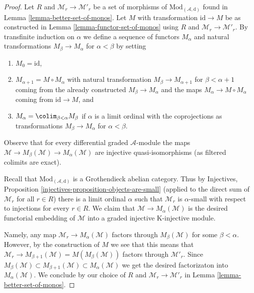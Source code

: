 \begin{proof}
Let $R$ and $\mathcal{M}_r \to \mathcal{M}'_r$ be a set of
morphisms of $\text{Mod}_{(\mathcal{A}, \text{d})}$ found in
Lemma \ref{lemma-better-set-of-monos}.
Let $M$ with transformation $\text{id} \to M$
be as constructed in Lemma \ref{lemma-functor-set-of-monos}
using $R$ and $\mathcal{M}_r \to \mathcal{M}'_r$.
By transfinite induction on $\alpha$ we define a sequence of functors
$M_\alpha$ and natural transformations $M_\beta \to M_\alpha$
for $\alpha < \beta$ by setting
\begin{enumerate}
\item $M_0 = \text{id}$,
\item $M_{\alpha + 1} = M \circ M_\alpha$ with natural transformation
$M_\beta \to M_{\alpha + 1}$ for $\beta < \alpha + 1$
coming from the already constructed $M_\beta \to M_\alpha$ and the
maps $M_\alpha \to M \circ M_\alpha$ coming from $\text{id} \to M$, and
\item $M_\alpha = \colim_{\beta < \alpha} M_\beta$ if $\alpha$
is a limit ordinal with the coprojections as transformations
$M_\beta \to M_\alpha$ for $\alpha < \beta$.
\end{enumerate}
Observe that for every differential graded $\mathcal{A}$-module the maps
$\mathcal{M} \to M_\beta(\mathcal{M}) \to M_\alpha(\mathcal{M})$
are injective quasi-isomorphisms (as filtered colimits are exact).

\medskip\noindent
Recall that $\text{Mod}_{(\mathcal{A}, \text{d})}$ is a Grothendieck
abelian category. Thus by
Injectives, Proposition \ref{injectives-proposition-objects-are-small}
(applied to the direct sum of $\mathcal{M}_r$ for all $r \in R$)
there is a limit ordinal $\alpha$ such that $\mathcal{M}_r$ is $\alpha$-small
with respect to injections for every $r \in R$.
We claim that $\mathcal{M} \to M_\alpha(\mathcal{M})$ is
the desired functorial embedding of $\mathcal{M}$ into a
graded injective K-injective module.

\medskip\noindent
Namely, any map $\mathcal{M}_r \to M_\alpha(\mathcal{M})$
factors through $M_\beta(\mathcal{M})$ for some $\beta < \alpha$.
However, by the construction of $M$ we see that this means
that $\mathcal{M}_r \to M_{\beta + 1}(\mathcal{M}) = M(M_\beta(\mathcal{M}))$
factors through $\mathcal{M}'_r$. Since
$M_\beta(\mathcal{M}) \subset  M_{\beta + 1}(\mathcal{M})
\subset M_\alpha(\mathcal{M})$ we get the desired factorizaton
into $M_\alpha(\mathcal{M})$. We conclude by our choice of
$R$ and $\mathcal{M}_r \to \mathcal{M}'_r$ in
Lemma \ref{lemma-better-set-of-monos}.
\end{proof}



















